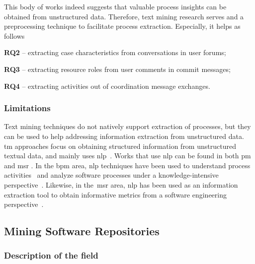 \documentclass[a4paper,11pt]{article}
\begin{document}
This body of works indeed suggests that valuable process insights can be obtained from unstructured data. Therefore, text mining research serves and a preprocessing technique to facilitate process extraction. Especially, it helps as follows 
\begin{inparaenum}[\itshape i)]
	\item \textbf{RQ2} -- extracting case characteristics from conversations in user forums;
	\item \textbf{RQ3} -- extracting resource roles from user comments in commit messages;
	\item \textbf{RQ4} -- extracting activities out of coordination message exchanges.
\end{inparaenum} 

\subsubsection{Limitations}
Text mining techniques do not natively support extraction of processes, but they can be used to help addressing information extraction from unstructured data. \Gls{tm} approaches focus on obtaining structured information from unstructured textual data, and mainly uses \gls{nlp}~\cite{Witten:1999}. Works that use \gls{nlp} can be found in both \gls{pm} \cite{VanderAalst2016b} and \gls{msr} \cite{Chen2016a}. In the \gls{bpm} \cite{Dumas2018} area, \gls{nlp} techniques have been used to understand process activities~\cite{Leopold2013,Mendling2014} and analyze software processes under a knowledge-intensive perspective~\cite{DeA.R.Goncalves2011,Richetti2017}. Likewise, in the~\gls{msr} area, \gls{nlp} has been used as an information extraction tool to obtain informative metrics from a software engineering perspective~\cite{Thomas2014,Chen2016a}. 
\subsection{Mining Software Repositories}
\label{sec:msr}

\subsubsection{Description of the field} 
\end{document}
